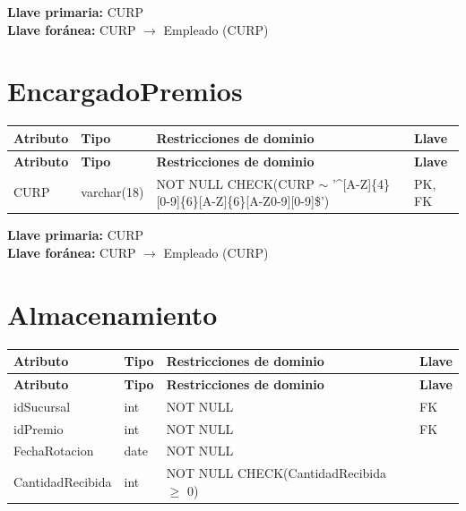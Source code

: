 \documentclass[12pt]{article}
\begin{document}
\vspace{2pt}
\textbf{Llave primaria:} CURP\\
\textbf{Llave foránea:} CURP $\rightarrow$ Empleado (CURP)\\


\section*{EncargadoPremios}

\begin{longtable}{p{3.5cm} p{2.5cm} p{7.5cm} p{1.5cm}}
\label{tab:encargadopremios}\\
\toprule
\textbf{Atributo} & \textbf{Tipo} & \textbf{Restricciones de dominio} & \textbf{Llave} \\
\midrule
\endfirsthead

\toprule
\textbf{Atributo} & \textbf{Tipo} & \textbf{Restricciones de dominio} & \textbf{Llave} \\
\midrule
\endhead

\bottomrule
\endfoot

CURP 
& varchar(18) 
& NOT NULL \newline CHECK(CURP $\sim$ '\^{}[A-Z]\{4\}[0-9]\{6\}[A-Z]\{6\}[A-Z0-9][0-9]\$')
& PK, FK \\

\end{longtable}

\vspace{2pt}
\textbf{Llave primaria:} CURP\\
\textbf{Llave foránea:} CURP $\rightarrow$ Empleado (CURP)\\

\section*{Almacenamiento}

\begin{longtable}{p{3.5cm} p{2.5cm} p{7.5cm} p{1.5cm}}
\label{tab:almacenamiento}\\
\toprule
\textbf{Atributo} & \textbf{Tipo} & \textbf{Restricciones de dominio} & \textbf{Llave} \\
\midrule
\endfirsthead

\toprule
\textbf{Atributo} & \textbf{Tipo} & \textbf{Restricciones de dominio} & \textbf{Llave} \\
\midrule
\endhead
\bottomrule
\endfoot

idSucursal 
& int 
& NOT NULL 
& FK \\

idPremio 
& int 
& NOT NULL 
& FK \\

FechaRotacion 
& date 
& NOT NULL 
& \\

CantidadRecibida 
& int 
& NOT NULL \newline CHECK(CantidadRecibida $\geq$ 0)
& \\

\end{longtable}
\end{document}
